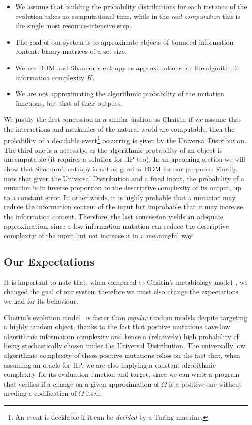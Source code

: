 \documentclass[10pt]{article}
\begin{document}
\begin{itemize}
    \item We assume that building the probability distributions for each instance of the evolution takes no computational time, while in the \textit{real computation} this is the single most resource-intensive step.
    \item The goal of our system is to approximate objects of bounded information content: binary matrices of a set size.
    \item We use BDM and Shannon's entropy as approximations for the algorithmic information complexity $K$.
    \item We are not approximating the algorithmic probability of the mutation functions, but that of their outputs. 
\end{itemize}
\noindent{}We justify the first concession in a similar fashion as Chaitin: if we assume that the interactions and mechanics of the natural world are computable, then the probability of a decidable event\footnote{An event is decidable if it can be \textit{decided} by a Turing machine.} occurring is given by the Universal Distribution. The third one is a necessity, as the algorithmic probability of an object is uncomputable (it requires a solution for HP too). In an upcoming section we will show that Shannon's entropy is not as good as BDM for our purposes. Finally, note that given the Universal Distribution and a fixed input, the probability of a mutation is in inverse proportion to the descriptive complexity of its output, up to a constant error. In other words, it is highly probable that a mutation may reduce the information content of the input but improbable that it may increase the information content. Therefore, the last concession yields an adequate approximation, since a low information mutation can reduce the descriptive complexity of the input but not increase it in a meaningful way.

\subsection{Our Expectations}\label{expectations}

It is important to note that, when compared to Chaitin's metabiology model~\cite{ChaitinBook}, we changed the goal of our system therefore we must also change the expectations we had for its behaviour.

Chaitin's evolution model~\cite{ChaitinBook} is faster than \textit{regular} random models despite targeting a highly random object, thanks to the fact that positive mutations have low algorithmic information complexity and hence a (relatively) high probability of being stochastically chosen under the Universal Distribution. The universally low algorithmic complexity of these positive mutations relies on the fact that, when assuming an oracle for HP, we are also implying a constant algorithmic complexity for its evaluation function and target, since we can write a program that verifies if a change on a given approximation of $\Omega$ is a positive one without needing a codification of $\Omega$ itself.
\end{document}
